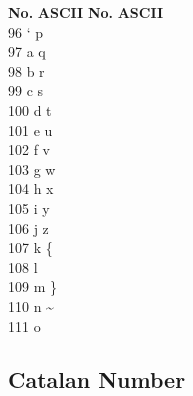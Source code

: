 \documentclass[11pt,letterpaper,twocolumn,twosided]{article}
\begin{document}
\begin{tabbing}
\textbf{No.}\hspace{1cm} \=  \textbf{ASCII}\hspace{2cm} \= \textbf{No.}\hspace{1cm} \= \textbf{ASCII}\hspace{2cm}  \\ 
96 \> `  \> p \\
97 \> a  \> q \\
98 \> b  \> r \\
99 \> c  \> s \\
100 \> d  \> t \\
101 \> e  \> u \\
102 \> f  \> v \\
103 \> g  \> w \\
104 \> h  \> x \\
105 \> i  \> y \\
106 \> j  \> z \\
107 \> k  \> \{ \\
108 \> l  \> \textbar \\
109 \> m  \> \} \\
110 \> n  \> \textasciitilde \\
111 \> o  \>  \\  
\end{tabbing}

\subsection{Catalan Number}
\end{document}
